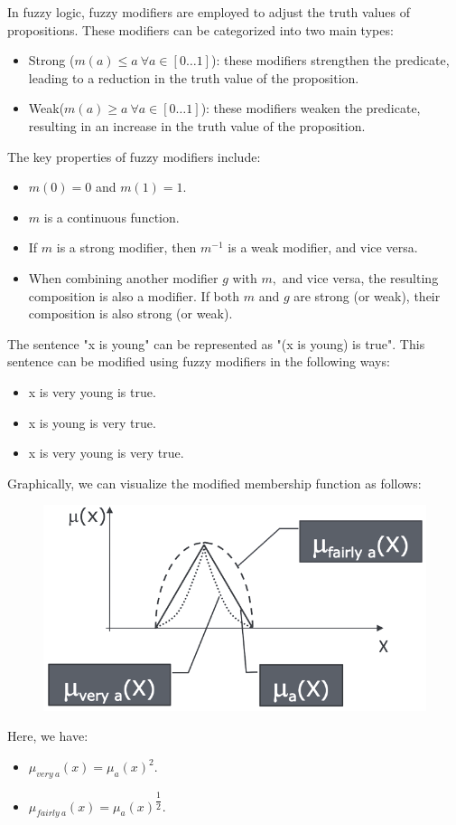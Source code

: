 \documentclass[12pt, a4paper]{report}
\begin{document}
    In fuzzy logic, fuzzy modifiers are employed to adjust the truth values of propositions. These modifiers can be categorized into two main types:
    \begin{itemize}
        \item Strong ($m(a) \leq a \: \forall a \in [0 \dots 1]$): these modifiers strengthen the predicate, leading to a reduction in the truth value of the proposition.
        \item Weak($m(a) \geq a \: \forall a \in [0 \dots 1]$): these modifiers weaken the predicate, resulting in an increase in the truth value of the proposition.
    \end{itemize}
    The key properties of fuzzy modifiers include:
    \begin{itemize}
        \item $m(0)=0$ and $m(1)=1$.
        \item $m$ is a continuous function. 
        \item If $m$ is a strong modifier, then $m^{-1}$ is a weak modifier, and vice versa.
        \item When combining another modifier $g$ with $m,$ and vice versa, the resulting composition is also a modifier. 
            If both $m$ and $g$ are strong (or weak), their composition is also strong (or weak).
    \end{itemize}
    \begin{example}
        The sentence "x is young" can be represented as "(x is young) is true". This sentence can be modified using fuzzy modifiers in the following ways:
        \begin{itemize}
            \item x is very young is true.
            \item x is young is very true.
            \item x is very young is very true.
        \end{itemize}
        Graphically, we can visualize the modified membership function as follows:
        \begin{figure}[H]
            \centering
            \includegraphics[width=0.4\linewidth]{images/modifiers.png}
        \end{figure}
        Here, we have:
        \begin{itemize}
            \item $\mu_{very \: a}(x)=\mu_a(x)^2$.
            \item $\mu_{fairly \: a}(x)=\mu_a(x)^{\dfrac{1}{2}}$.
        \end{itemize}
    \end{example}
\end{document}
